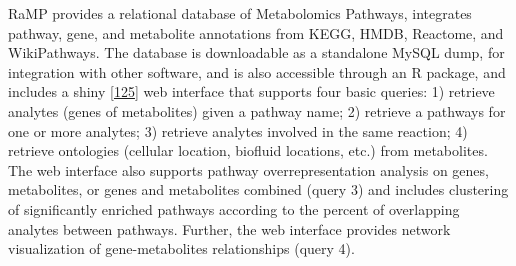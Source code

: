 \documentclass[]{article}
\begin{document}
RaMP provides a relational database of Metabolomics Pathways, integrates pathway, gene, and metabolite annotations from KEGG, HMDB, Reactome, and WikiPathways. The database is downloadable as a standalone MySQL dump, for integration with other software, and is also accessible through an R package, and includes a shiny {[}\protect\hyperlink{ref-chang_website_2012}{125}{]} web interface that supports four basic queries: 1) retrieve analytes (genes of metabolites) given a pathway name; 2) retrieve a pathways for one or more analytes; 3) retrieve analytes involved in the same reaction; 4) retrieve ontologies (cellular location, biofluid locations, etc.) from metabolites. The web interface also supports pathway overrepresentation analysis on genes, metabolites, or genes and metabolites combined (query 3) and includes clustering of significantly enriched pathways according to the percent of overlapping analytes between pathways. Further, the web interface provides network visualization of gene-metabolites relationships (query 4).
\end{document}
